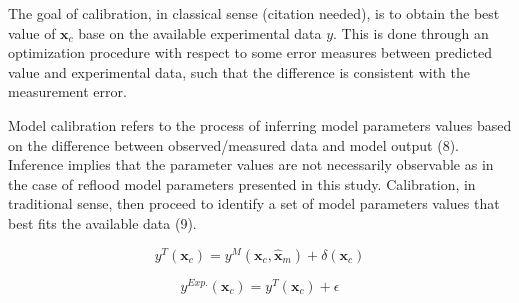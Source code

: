 The goal of calibration, in classical sense (citation needed), is to obtain the best value of $\bm{x}_c$ base on the available experimental data $y$.
This is done through an optimization procedure with respect to some error measures between predicted value and experimental data, such that the difference is consistent with the measurement error.


Model calibration refers to the process of inferring model parameters values based on the difference between observed/measured data and model output (8).
Inference implies that the parameter values are not necessarily observable as in the case of reflood model parameters presented in this study.
Calibration, in traditional sense, then proceed to identify a set of model parameters values that best fits the available data (9).






\begin{equation}
    y^T(\bm{x}_c) = y^M (\bm{x}_c, \bm{\hat{x}}_m) + \delta(\bm{x}_c)
\label{eq:bc_koh_true_model}
\end{equation}

\begin{equation}
    y^{Exp.}(\bm{x}_c) = y^T (\bm{x}_c) + \epsilon
\label{eq:bc_koh_true_measured}
\end{equation}



